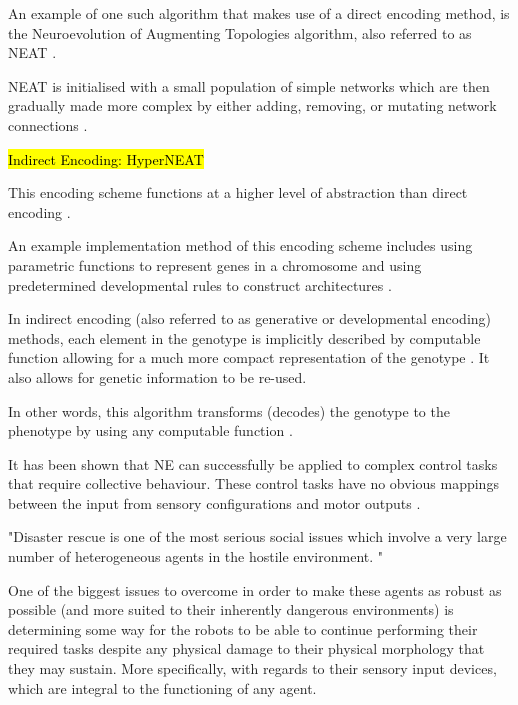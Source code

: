 An example of one such algorithm that makes use of a direct encoding method, is the Neuroevolution of Augmenting Topologies algorithm, also referred to as NEAT \cite{Gomez2003}.

NEAT is initialised with a small population of simple networks which are then gradually made more complex by either adding, removing, or mutating network connections \cite{RefWorks:11, Gomez2003}.


\hl{Indirect Encoding: HyperNEAT}

This encoding scheme functions at a higher level of abstraction than direct encoding  \cite{Gomez2003}.

An example implementation method of this encoding scheme includes using parametric functions to represent genes in a chromosome and using predetermined developmental rules to construct architectures \cite{koutnik2010evolving}.

In indirect encoding (also referred to as generative or developmental encoding) methods, each element in the genotype is implicitly described by computable function allowing for a much more compact representation of the genotype \cite{clune2011performance, stanley2009hypercube}. It also allows for genetic information to be re-used.

In other words, this algorithm transforms (decodes) the genotype to the phenotype by using any computable function \cite{koutnik2010evolving}.






It has been shown that NE can successfully be applied to complex control tasks that require collective behaviour. These control tasks have no obvious mappings between the input from sensory configurations and motor outputs \cite{NitschkeSaEC2012}.



"Disaster rescue is one of the most serious social issues which involve a very large number of heterogeneous agents in the hostile environment. "\cite{KitanoTadokoro1999}


One of the biggest issues to overcome in order to make these agents as robust as possible (and more suited to their inherently dangerous environments) is determining some way for the robots to be able to continue performing their required tasks despite any physical damage to their physical morphology that they may sustain. More specifically, with regards to their sensory input devices, which are integral to the functioning of any agent.

